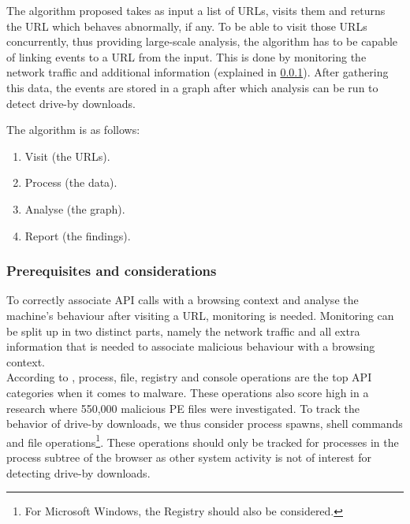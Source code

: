 The algorithm proposed takes as input a list of URLs, visits them and returns the URL which behaves abnormally, if any. To be able to visit those URLs concurrently, thus providing large-scale analysis, the algorithm has to be capable of linking events to a URL from the input. This is done by monitoring the network traffic and additional information (explained in \ref{sec:prereq}). After gathering this data, the events are stored in a graph after which analysis can be run to detect drive-by downloads.

The algorithm is as follows:

\begin{changemargin}{5cm}{0cm}
\begin{enumerate}
\item Visit (the URLs).
\item Process (the data).
\item Analyse (the graph).
\item Report (the findings).
\end{enumerate}
\end{changemargin}

\subsubsection{Prerequisites and considerations}
\label{sec:prereq}

To correctly associate API calls with a browsing context and analyse the machine's behaviour after visiting a URL, monitoring is needed. Monitoring can be split up in two distinct parts, namely the network traffic and all extra information that is needed to associate malicious behaviour with a browsing context.\\

According to \cite{Sami:2010:MDB:1774088.1774303}, process, file, registry and console operations are the top API categories when it comes to malware. These operations also score high in a research \cite{MaliciousAPIs} where 550,000 malicious PE files were investigated. To track the behavior of drive-by downloads, we thus consider process spawns, shell commands and file operations\footnote{For Microsoft Windows, the Registry should also be considered.}. These operations should only be tracked for processes in the process subtree of the browser as other system activity is not of interest for detecting drive-by downloads.\\

